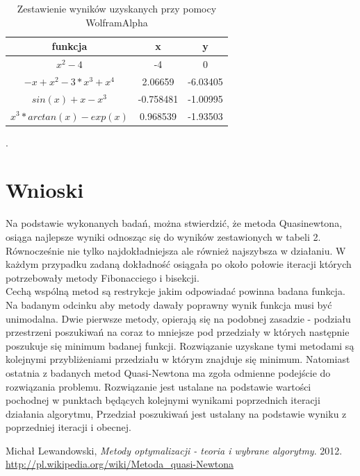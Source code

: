 \documentclass{classrep}
\begin{document}
 	\begin{table}[H]
		\begin{center}
		\begin{tabular}{|c|c|c|}
		\hline funkcja & x & y \\ 
\hline $x^2 - 4$ & -4 & 0 \\ 
\hline $-x + x^2 - 3*x^3 + x^4$  & 2.06659 & -6.03405 \\ 
\hline $sin(x)+x-x^3$  & -0.758481 & -1.00995 \\ 
\hline $x^3*arctan(x)-exp(x)$  & 0.968539 & -1.93503 \\ 
\hline 
\end{tabular} 
				\caption{Zestawienie wyników uzyskanych przy pomocy WolframAlpha }.
		\end{center}
		\label{wolfram}
	\end{table}
	

\section{Wnioski}

Na podstawie wykonanych badań, można stwierdzić, że metoda Quasi\-newtona, osiąga najlepsze wyniki odnosząc się do wyników zestawionych w tabeli 2. Równocześnie nie tylko najdokładniejsza ale również najszybsza w działaniu. W każdym przypadku zadaną dokładność osiągała po około połowie iteracji których potrzebowały metody Fibonacciego i bisekcji. \\
\indent Cechą wspólną metod są restrykcje jakim odpowiadać powinna badana funkcja. Na badanym odcinku aby metody dawały poprawny wynik funkcja musi być unimodalna. Dwie pierwsze metody, opierają się na podobnej zasadzie - podziału przestrzeni poszukiwań na coraz to mniejsze pod przedziały w których następnie poszukuje się minimum badanej funkcji. Rozwiązanie uzyskane tymi metodami są kolejnymi przybliżeniami przedziału w którym znajduje się minimum. Natomiast ostatnia z badanych metod Quasi-Newtona ma zgoła odmienne podejście do rozwiązania problemu. Rozwiązanie jest ustalane na podstawie wartości pochodnej w punktach będących kolejnymi wynikami poprzednich iteracji działania algorytmu, Przedział poszukiwań jest ustalany na podstawie wyniku z poprzedniej iteracji i obecnej.

\begin{thebibliography}{9}
	Michał Lewandowski,  \emph{Metody optymalizacji - teoria i wybrane algorytmy}.  2012.
	\url{http://pl.wikipedia.org/wiki/Metoda\_quasi-Newtona}
\end{thebibliography}
\end{document}
